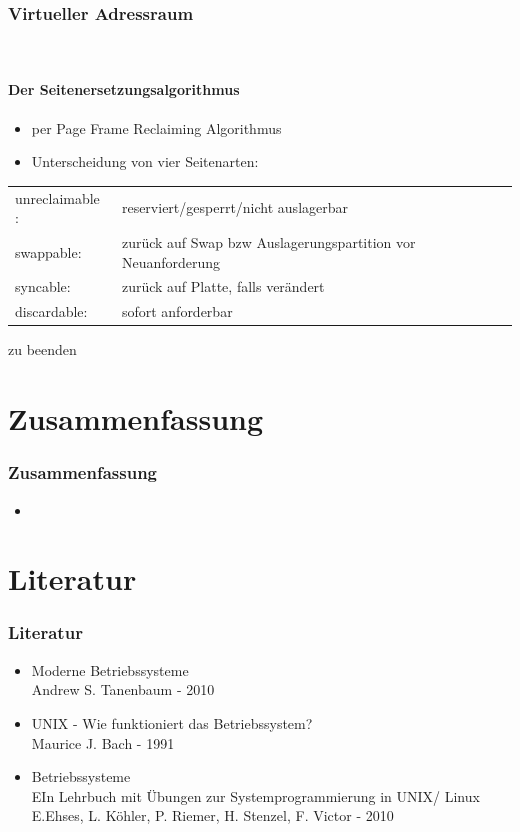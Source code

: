 \documentclass[ddcfooter,nosectionnum]{tudbeamer}
\begin{document}
\begin{frame}
	\frametitle{Virtueller Adressraum}\
	\framesubtitle {Der Seitenersetzungsalgorithmus}
 	\begin{itemize}
		\item per Page Frame Reclaiming Algorithmus
		\item Unterscheidung von vier Seitenarten:
	\end{itemize}	
		
		\begin{center}
		{\tiny
		\begin{tabular}{ l l }
 			 unreclaimable :&  reserviert/gesperrt/nicht auslagerbar \\
  			 swappable:       &  zurück auf Swap bzw Auslagerungspartition vor Neuanforderung\\
 			 syncable:		 &  zurück auf Platte, falls verändert\\
			 discardable:      & sofort anforderbar\\
		\end{tabular}
		}
		\end{center}
		
		zu beenden

			
    
\end{frame}



\section{Zusammenfassung}
\begin{frame}
    \frametitle{Zusammenfassung}
    \begin{itemize}
         \item   
    
    
    
     \end{itemize}
    
\end{frame}


\section{Literatur}
\begin{frame}
    \frametitle{Literatur}
    \begin{itemize}
         \item  Moderne Betriebssysteme \\
        		Andrew S. Tanenbaum - 2010
	\item	 UNIX - Wie funktioniert das Betriebssystem? \\
		Maurice J. Bach - 1991
	\item Betriebssysteme\\
		EIn Lehrbuch mit Übungen zur Systemprogrammierung in UNIX/ Linux \\
		E.Ehses, L. Köhler, P. Riemer, H. Stenzel, F. Victor - 2010	
    \end{itemize}
    
\end{frame}
\end{document}
